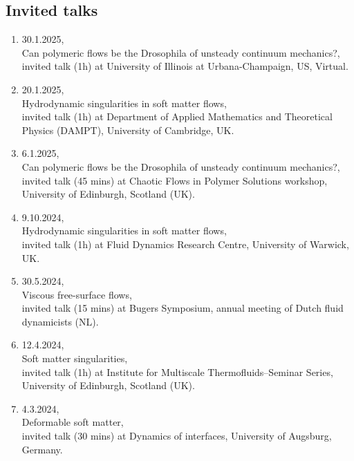\documentclass[10pt,a4paper,colorlinks,linkcolor=blue,urlcolor=blue,citecolor=blue]{moderncv}
\begin{document}
\subsection{\hspace*{-1.8cm}Invited talks}
\begin{enumerate}[leftmargin=0.75cm]
	\item 30.1.2025,\\
	Can polymeric flows be the Drosophila of unsteady continuum mechanics?,\\
	invited talk (1h) at University of Illinois at Urbana-Champaign, US, Virtual.

	\item 20.1.2025,\\
	Hydrodynamic singularities in soft matter flows,\\
	invited talk (1h) at Department of Applied Mathematics and Theoretical Physics (DAMPT), University of Cambridge, UK.

	\item 6.1.2025,\\
	Can polymeric flows be the Drosophila of unsteady continuum mechanics?,\\
	invited talk (45 mins) at Chaotic Flows in Polymer Solutions workshop, University of Edinburgh, Scotland (UK).

	\item 9.10.2024,\\
	Hydrodynamic singularities in soft matter flows,\\
	invited talk (1h) at Fluid Dynamics Research Centre, University of Warwick, UK.

	\item 30.5.2024,\\
	Viscous free-surface flows,\\
	invited talk (15 mins) at Bugers Symposium, annual meeting of Dutch fluid dynamicists (NL).

	\item 12.4.2024,\\
	Soft matter singularities,\\
	invited talk (1h) at Institute for Multiscale Thermofluids--Seminar Series, University of Edinburgh, Scotland (UK).

	\item 4.3.2024,\\
	Deformable soft matter,\\
	invited talk (30 mins) at Dynamics of interfaces, University of Augsburg, Germany.


\end{enumerate}
\end{document}
